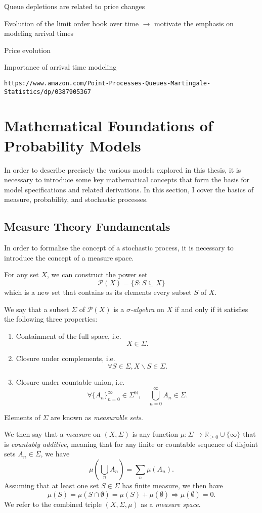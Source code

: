 \documentclass[honours,12pt]{unswthesis}
\def\implies{\Rightarrow}
\numberwithin{equation}{section}
\begin{document}
Queue depletions are related to price changes \cite{BouchaudEtAl}

Evolution of the limit order book over time $\to$ motivate the emphasis on modeling arrival times

Price evolution

Importance of arrival time modeling

\texttt{https://www.amazon.com/Point-Processes-Queues-Martingale-Statistics/dp/0387905367}

\section{Mathematical Foundations of Probability Models}
In order to describe precisely the various models explored in this thesis, it is necessary to introduce some key mathematical concepts that form the basis for model specifications and related derivations. In this section, I cover the basics of measure, probability, and stochastic processes.

\subsection{Measure Theory Fundamentals}
In order to formalise the concept of a stochastic process, it is necessary to introduce the concept of a measure space.

For any set $X$, we can construct the power set
$$\mathcal{P}(X) = \{S : S\subseteq X\}$$
which is a new set that contains as its elements every subset $S$ of $X$.

We say that a subset $\Sigma$ of $\mathcal{P}(X)$ is a  \textit{$\sigma$-algebra} on $X$ if and only if it satisfies the following three properties:
\begin{enumerate}
	\item Containment of the full space, i.e. $$X\in\Sigma.$$
	\item Closure under complements, i.e. $$\forall S \in \Sigma, X\backslash S\in\Sigma.$$
	\item Closure under countable union, i.e. $$\forall \{A_n\}_{n=0}^\infty\in\Sigma^{\mathbb{N}},\quad\bigcup_{n=0}^\infty A_n \in \Sigma.$$
\end{enumerate}
Elements of $\Sigma$ are known as \textit{measurable sets}.

We then say that a \textit{measure} on $(X,\Sigma)$ is any function $\mu:\Sigma\to\mathbb{R}_{\geq 0}\cup\{\infty\}$ that is \textit{countably additive}, meaning that for any finite or countable sequence of disjoint sets $A_n\in\Sigma$, we have
$$\mu\left(\bigcup_n A_n\right) = \sum_n \mu(A_n).$$
Assuming that at least one set $S\in\Sigma$ has finite measure, we then have $$\mu(S)=\mu(S\cap\emptyset)=\mu(S)+\mu(\emptyset) \implies \mu(\emptyset)=0.$$
We refer to the combined triple $(X,\Sigma,\mu)$ as a \textit{measure space}.
\end{document}
